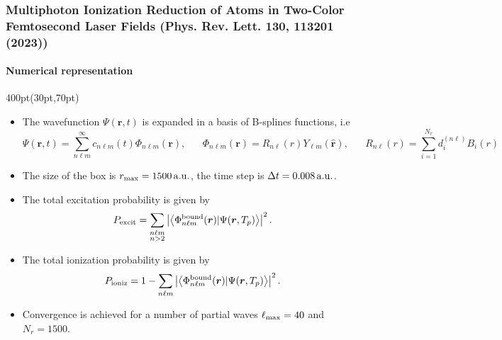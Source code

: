 \begin{frame}
\frametitle{Multiphoton Ionization Reduction of Atoms in Two-Color 
Femtosecond Laser Fields \small (Phys. Rev. Lett. \textbf{130}, 113201 (2023))}
\framesubtitle{Numerical representation}


\footnotesize
\begin{textblock*}{400pt}(30pt,70pt)
\begin{itemize}
\item The wavefunction $\Psi(\boldsymbol{r},t)$ is expanded in a basis of 
B-splines functions, i.e
\begin{equation}
\Psi(\boldsymbol{r},t) 
  = \sum_{n\ell m}^{\infty} c_{n\ell m}(t) \Phi_{n\ell m}(\boldsymbol{r}),
  \hspace{20pt}
\Phi_{n\ell m}(\boldsymbol{r}) = 
 R_{n\ell}(r)Y_{\ell m}(\hat{\boldsymbol{r}}), \hspace{20pt}
 R_{n\ell}(r) = \sum_{i=1}^{N_r} d_{i}^{(n\ell)} B_i (r)
\end{equation}
\item The size of the box is $r_{\rm max}=1500\,\rm a.u.$, 
the time step is $\Delta t =0.008\,{\rm a.u.}$.
\item The total excitation probability is given by
\begin{equation}
P_{\rm excit} = \sum_{\substack{n\ell m \\ n>2}} 
\left|\left\langle \Phi_{n\ell m}^{\rm bound}(\boldsymbol{r}) | 
   \Psi(\boldsymbol{r},T_p) \right\rangle\right|^2.
\end{equation}

\item The total ionization probability is given by
\begin{equation}
P_{\rm ioniz} =  1 - \sum_{\substack{n\ell m}} 
\left|\left\langle \Phi_{n\ell m}^{\rm bound}(\boldsymbol{r}) | 
   \Psi(\boldsymbol{r},T_p) \right\rangle\right|^2.
\end{equation}

\item Convergence is achieved for a number of partial waves 
$\ell_{\rm max}=40$ and $N_r=1500$.
\end{itemize}
\end{textblock*}



\end{frame}







